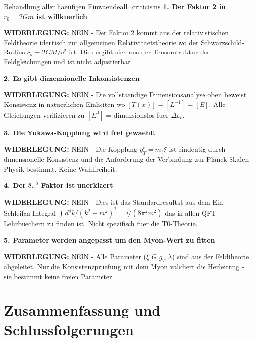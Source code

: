 \documentclass[12pt,a4paper]{article}
\begin{document}
	\begin{criticism}{Behandlung aller haeufigen Einwaende}{all_criticisms}
		\textbf{1. Der Faktor 2 in $r_0 = 2Gm$ ist willkuerlich}
		
		\textbf{WIDERLEGUNG:} NEIN - Der Faktor 2 kommt aus der relativistischen Feldtheorie identisch zur allgemeinen Relativitaetstheorie wo der Schwarzschild-Radius $r_s = 2GM/c^2$ ist. Dies ergibt sich aus der Tensorstruktur der Feldgleichungen und ist nicht adjustierbar.
		
		\textbf{2. Es gibt dimensionelle Inkonsistenzen}
		
		\textbf{WIDERLEGUNG:} NEIN - Die vollstaendige Dimensionsanalyse oben beweist Konsistenz in natuerlichen Einheiten wo $[T(x)] = [L^{-1}] = [E]$. Alle Gleichungen verifizieren zu $[E^0]$ = dimensionslos fuer $\Delta a_\ell$.
		
		\textbf{3. Die Yukawa-Kopplung wird frei gewaehlt}
		
		\textbf{WIDERLEGUNG:} NEIN - Die Kopplung $g_T^\ell = m_\ell \xi$ ist eindeutig durch dimensionelle Konsistenz und die Anforderung der Verbindung zur Planck-Skalen-Physik bestimmt. Keine Wahlfreiheit.
		
		\textbf{4. Der $8\pi^2$ Faktor ist unerklaert}
		
		\textbf{WIDERLEGUNG:} NEIN - Dies ist das Standardresultat aus dem Ein-Schleifen-Integral $\int d^4k/(k^2-m^2)^2 = i/(8\pi^2 m^2)$ das in allen QFT-Lehrbuechern zu finden ist. Nicht spezifisch fuer die T0-Theorie.
		
		\textbf{5. Parameter werden angepasst um den Myon-Wert zu fitten}
		
		\textbf{WIDERLEGUNG:} NEIN - Alle Parameter ($\xi$ $G$ $g_T$ $\lambda$) sind aus der Feldtheorie abgeleitet. Nur die Konsistenzpruefung mit dem Myon validiert die Herleitung - sie bestimmt keine freien Parameter.
	\end{criticism}
	
	\section{Zusammenfassung und Schlussfolgerungen}
	
\end{document}
